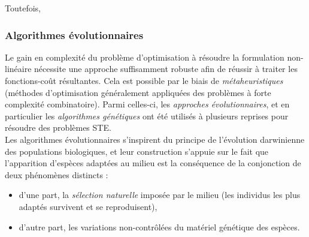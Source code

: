  Toutefois,  

\subsubsection{Algorithmes évolutionnaires}

Le gain en complexité du problème d'optimisation à résoudre  la formulation non-linéaire nécessite une approche suffisamment robuste afin de réussir à traiter les fonctions-coût résultantes. Cela est possible par le biais de \textit{métaheuristiques} (méthodes d'optimisation généralement appliquées des problèmes à forte complexité combinatoire). Parmi celles-ci, les \textit{approches évolutionnaires}, et en particulier les \textit{algorithmes génétiques} ont été utilisés à plusieurs reprises pour résoudre des problèmes STE.\\
Les algorithmes évolutionnaires s'inspirent du principe de l'évolution darwinienne des populations biologiques, et leur construction s'appuie sur le fait que l'apparition d'espèces adaptées au milieu est la conséquence de la conjonction de deux phénomènes distincts : 

 \begin{itemize}
 	\item d'une part, la \textit{sélection naturelle} imposée par le milieu (les individus les plus adaptés survivent et se reproduisent),
 	\item d'autre part, les variations non-contrôlées du matériel génétique des espèces.
 \end{itemize}
 
